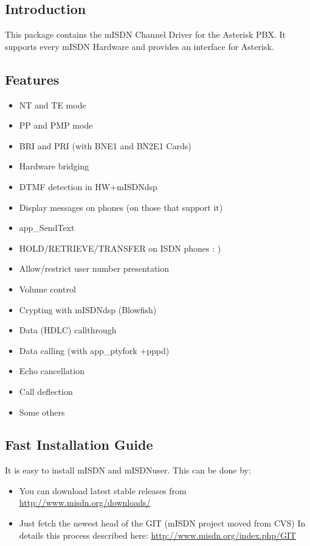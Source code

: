 \subsection{Introduction}

This package contains the mISDN Channel Driver for the Asterisk PBX. It
supports every mISDN Hardware and provides an interface for Asterisk.

\subsection{Features}

\begin{itemize}
\item NT and TE mode
\item PP and PMP mode
\item BRI and PRI (with BNE1 and BN2E1 Cards)
\item Hardware bridging
\item DTMF detection in HW+mISDNdsp
\item Display messages on phones (on those that support it)
\item app\_SendText
\item HOLD/RETRIEVE/TRANSFER on ISDN phones : )
\item Allow/restrict user number presentation
\item Volume control
\item Crypting with mISDNdsp (Blowfish)
\item Data (HDLC) callthrough
\item Data calling (with app\_ptyfork +pppd)
\item Echo cancellation
\item Call deflection
\item Some others
\end{itemize}

\subsection{Fast Installation Guide}

It is easy to install mISDN and mISDNuser. This can be done by:
\begin{itemize}
     \item You can download latest stable releases from \url{http://www.misdn.org/downloads/}

     \item Just fetch the newest head of the GIT (mISDN project moved from CVS)
     In details this process described here: \url{http://www.misdn.org/index.php/GIT}
\end{itemize}


